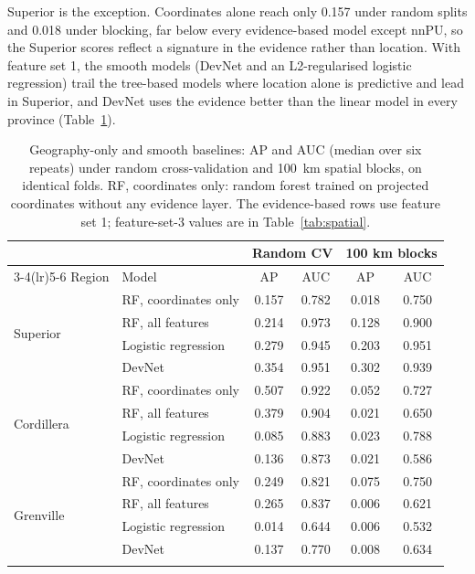 \documentclass[pdflatex,sn-apa]{sn-jnl}
\begin{document}
Superior is the exception. Coordinates alone reach only 0.157 under random splits and 0.018 under blocking, far below every evidence-based model except nnPU, so the Superior scores reflect a signature in the evidence rather than location. With feature set 1, the smooth models (DevNet and an L2-regularised logistic regression) trail the tree-based models where location alone is predictive and lead in Superior, and DevNet uses the evidence better than the linear model in every province (Table~\ref{tab:geography}).

\begin{table}[t]
\caption{Geography-only and smooth baselines: AP and AUC (median over six repeats) under random cross-validation and 100~km spatial blocks, on identical folds. RF, coordinates only: random forest trained on projected coordinates without any evidence layer. The evidence-based rows use feature set 1; feature-set-3 values are in Table~\ref{tab:spatial}.}\label{tab:geography}
\footnotesize
\setlength{\tabcolsep}{3pt}
\begin{tabular*}{\textwidth}{@{\extracolsep\fill}llcccc}
\toprule
 & & \multicolumn{2}{c}{Random CV} & \multicolumn{2}{c}{100 km blocks} \\
\cmidrule(lr){3-4}\cmidrule(lr){5-6}
Region & Model & AP & AUC & AP & AUC \\
\midrule
\multirow{4}{*}{Superior} & RF, coordinates only & 0.157 & 0.782 & 0.018 & 0.750 \\
 & RF, all features & 0.214 & 0.973 & 0.128 & 0.900 \\
 & Logistic regression & 0.279 & 0.945 & 0.203 & 0.951 \\
 & DevNet & 0.354 & 0.951 & 0.302 & 0.939 \\
\midrule
\multirow{4}{*}{Cordillera} & RF, coordinates only & 0.507 & 0.922 & 0.052 & 0.727 \\
 & RF, all features & 0.379 & 0.904 & 0.021 & 0.650 \\
 & Logistic regression & 0.085 & 0.883 & 0.023 & 0.788 \\
 & DevNet & 0.136 & 0.873 & 0.021 & 0.586 \\
\midrule
\multirow{4}{*}{Grenville} & RF, coordinates only & 0.249 & 0.821 & 0.075 & 0.750 \\
 & RF, all features & 0.265 & 0.837 & 0.006 & 0.621 \\
 & Logistic regression & 0.014 & 0.644 & 0.006 & 0.532 \\
 & DevNet & 0.137 & 0.770 & 0.008 & 0.634 \\
\botrule
\end{tabular*}
\end{table}
\end{document}
